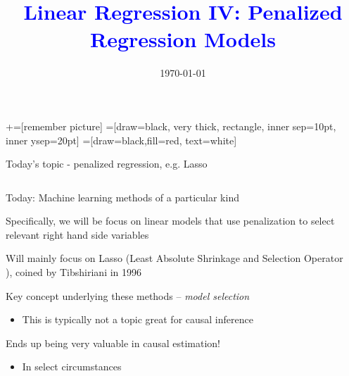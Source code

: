 \documentclass[notes,11pt, aspectratio=169]{beamer}
\title[]{\textcolor{blue}{Linear Regression IV: Penalized Regression Models }}
\author[PGP]{}
\institute[FRBNY]{\small{Paul Goldsmith-Pinkham}}
\date{\today}
\newenvironment{wideitemize}{\itemize\addtolength{\itemsep}{10pt}}{\enditemize}
\begin{document}
\newcommand\marktopleft[1]{%
    \tikz[overlay,remember picture] 
        \node (marker-#1-a) at (-.3em,.3em) {};%
}
\newcommand\markbottomright[2]{%
    \tikz[overlay,remember picture] 
        \node (marker-#1-b) at (0em,0em) {};%
}
+=[remember picture] 
 =[draw=black, very thick, rectangle, inner sep=10pt, inner ysep=20pt]
 =[draw=black,fill=red, text=white]

\begin{frame}
\maketitle

\end{frame}


\begin{frame}{Today's topic - penalized regression, e.g. Lasso}
  \begin{columns}[T] %
    \begin{column}{.8\textwidth}
      \begin{wideitemize}
      \item Today: Machine learning methods of a particular kind
      \item Specifically, we will be focus on linear models that use
        penalization to select relevant right hand side variables
      \item Will mainly focus on Lasso (Least Absolute Shrinkage and
        Selection Operator ), coined by Tibshiriani in 1996
      \item Key concept underlying these methods -- \emph{model selection}
        \begin{itemize}
        \item This is typically not a topic great for causal inference
        \end{itemize}
      \item Ends up being very valuable in causal estimation!
        \begin{itemize}
        \item In select circumstances
        \end{itemize}
      \end{wideitemize}
    \end{column}%
  \hfill%
  \begin{column}{.5\textwidth}
  \end{column}
\end{columns}
\end{frame}
\end{document}
